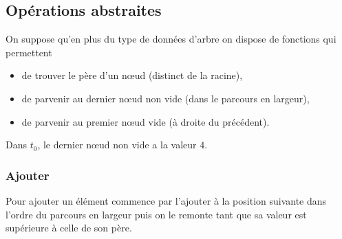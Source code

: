 \subsection{Opérations abstraites}
On suppose qu'en plus du type de données d'arbre on dispose de fonctions qui permettent 
\begin{itemize}
    \item de trouver le père d'un nœud (distinct de la racine),
    \item de parvenir au dernier nœud non vide (dans le parcours en largeur),
    \item de parvenir au premier nœud vide (à droite du précédent).
\end{itemize}
Dans $t_0$, le dernier nœud non vide a la valeur $4$.
\subsubsection{Ajouter}
	Pour ajouter un élément commence par l'ajouter à la position suivante dans l'ordre du parcours en largeur puis on le remonte tant que sa valeur est supérieure à celle de son père. 
	
